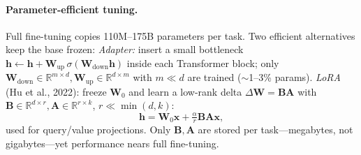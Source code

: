 \paragraph{Parameter-efficient tuning.} Full fine-tuning copies 110M--175B parameters per task. Two efficient alternatives keep the base frozen:
\textit{Adapter:} insert a small bottleneck $\mathbf{h}\gets\mathbf{h}+ \mathbf{W}_{\text{up}}\,\sigma(\mathbf{W}_{\text{down}}\mathbf{h})$ inside each Transformer block; only $\mathbf{W}_{\text{down}}\in\mathbb{R}^{m\times d},\mathbf{W}_{\text{up}}\in\mathbb{R}^{d\times m}$ with $m\ll d$ are trained ($\sim$1--3\% params).
\textit{LoRA} (Hu et al., 2022): freeze $\mathbf{W}_0$ and learn a low-rank delta $\Delta\mathbf{W}=\mathbf{B}\mathbf{A}$ with $\mathbf{B}\in\mathbb{R}^{d\times r},\mathbf{A}\in\mathbb{R}^{r\times k}$, $r\ll\min(d,k)$:
\begin{equation}
\mathbf{h}=\mathbf{W}_0\mathbf{x}+\tfrac{\alpha}{r}\mathbf{B}\mathbf{A}\mathbf{x},
\label{eq:lora}
\end{equation}
used for query/value projections. Only $\mathbf{B},\mathbf{A}$ are stored per task---megabytes, not gigabytes---yet performance nears full fine-tuning.

